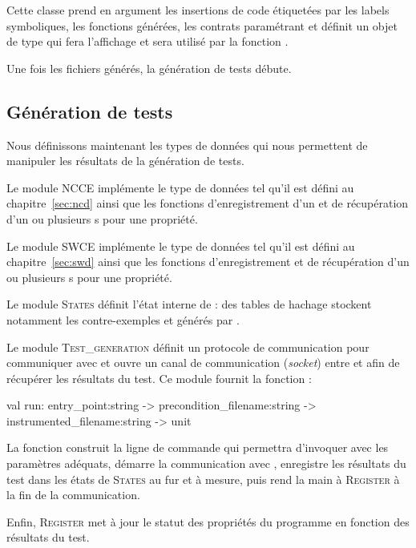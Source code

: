 Cette classe prend en argument les insertions de code étiquetées par les
labels symboliques, les fonctions générées, les contrats paramétrant \SWD et
définit un objet de type  qui fera l'affichage et sera
utilisé par la fonction .

Une fois les fichiers générés, la génération de tests débute.


\subsection{Génération de tests}


Nous définissons maintenant les types de données qui nous permettent de
manipuler les résultats de la génération de tests.

Le module \textsc{NCCE} implémente le type de données \NCCE tel qu'il est défini
au chapitre~\ref{sec:ncd} ainsi que les fonctions d'enregistrement d'un \NCCE
et de récupération d'un ou plusieurs \NCCE{}s pour une propriété.

Le module \textsc{SWCE} implémente le type de données \SWCE tel qu'il est défini
au chapitre~\ref{sec:swd} ainsi que les fonctions d'enregistrement et de
récupération d'un ou plusieurs \SWCE{}s pour une propriété.

Le module \textsc{States} définit l'état interne de \stady : des tables
de hachage stockent notamment les contre-exemples \NCCE et \SWCE générés par
\pathcrawler.

Le module \textsc{Test\_generation} définit un protocole de communication pour
communiquer avec \pathcrawler et ouvre un canal de communication ({\em socket})
entre \stady et \pathcrawler afin de récupérer les résultats du test.
Ce module fournit la fonction :

\begin{ocamlcode}
val run: entry_point:string ->
	 precondition_filename:string ->
	 instrumented_filename:string ->
	 unit
\end{ocamlcode}

La fonction  construit la ligne de commande qui permettra
d'invoquer \pathcrawler avec les paramètres adéquats, démarre la communication
avec \pathcrawler, enregistre les résultats du test dans les états de
\textsc{States} au fur et à mesure, puis rend la main à \textsc{Register} à la
fin de la communication.

Enfin, \textsc{Register} met à jour le statut des propriétés du programme en
fonction des résultats du test.


